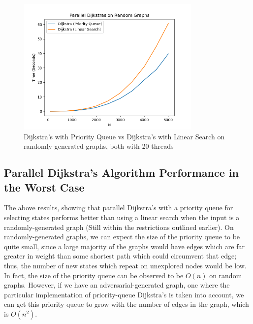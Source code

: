 \documentclass[conference]{IEEEtran}
\begin{document}
\begin{figure}[t]
    
\end{figure}


\begin{figure}[h]
    \centering
    \includegraphics[width=9cm]{images/benchdijkstra.png}
    \caption{Dijkstra's with Priority Queue vs Dijkstra's with Linear Search on randomly-generated graphs, both with 20 threads}
    \label{fig:dijkstra_both}
\end{figure}

\subsection{Parallel Dijkstra's Algorithm Performance in the Worst Case}\label{AA}
The above results, showing that parallel Dijkstra's with a priority queue for selecting states performs better than using a linear search when the input is a randomly-generated graph (Still within the restrictions outlined earlier). On randomly-generated graphs, we can expect the size of the priority queue to be quite small, since a large majority of the graphs would have edges which are far greater in weight than some shortest path which could circumvent that edge; thus, the number of new states which repeat on unexplored nodes would be low. In fact, the size of the priority queue can be observed to be $O(n)$ on random graphs. However, if we have an adversarial-generated graph, one where the particular implementation of priority-queue Dijkstra's is taken into account, we can get this priority queue to grow with the number of edges in the graph, which is $O(n^2)$. 
\end{document}
